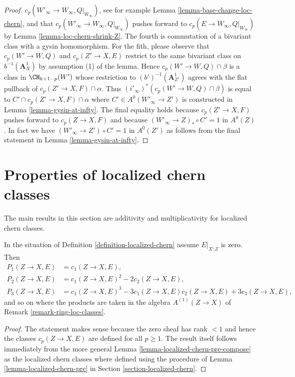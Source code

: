 \begin{proof}
$c_p(W'_\infty \to W_\infty, Q|_{W_\infty})$, see for example
Lemma \ref{lemma-base-change-loc-chern}, and that
$c_p(W'_\infty \to W_\infty, Q|_{W_\infty})$
pushes forward to $c_p(E \to W_\infty, Q|_{W_\infty})$
by Lemma \ref{lemma-loc-chern-shrink-Z}.
The fourth is commutation of a bivariant class with
a gysin homomorphism. For the fith, please observe that
$c_p(W' \to W, Q)$ and $c_p(Z' \to X, E)$ restrict to the
same bivariant class on $b^{-1}(\mathbf{A}^1_X)$ by
assumption (1) of the lemma. Hence $c_p(W' \to W, Q) \cap \beta$
is a class in $\CH_{k + 1 - p}(W')$ whose restriction to
$(b')^{-1}(\mathbf{A}^1_{Z'})$ agrees with the flat pullback
of $c_p(Z' \to X, F) \cap \alpha$. Thus
$(i'_\infty)^*(c_p(W' \to W, Q) \cap \beta)$ is equal to
$C' \cap c_p(Z' \to X, F) \cap \alpha$ where
$C' \in A^0(W'_\infty \to Z')$ is constructed in
Lemma \ref{lemma-gysin-at-infty}.
The final equality holds because $c_p(Z' \to X, F)$ pushes forward
to $c_p(Z \to X, F)$ and because $(W'_\infty \to Z)_* \circ C' = 1$ in $A^0(Z)$.
In fact we have $(W'_\infty \to Z') \circ C' = 1$ in $A^0(Z')$ as
follows from the final statement in Lemma \ref{lemma-gysin-at-infty}.
\end{proof}







\section{Properties of localized chern classes}
\label{section-properties-loc-chern}

\noindent
The main results in this section are additivity and multiplicativity
for localized chern classes.

\begin{lemma}
\label{lemma-loc-chern-character}
In the situation of Definition \ref{definition-localized-chern}
assume $E|_{X \setminus Z}$ is zero. Then
\begin{align*}
P_1(Z \to X, E) & = c_1(Z \to X, E), \\
P_2(Z \to X, E) & = c_1(Z \to X, E)^2 - 2c_2(Z \to X, E), \\
P_3(Z \to X, E) & = c_1(Z \to X, E)^3 - 3c_1(Z \to X, E)c_2(Z \to X, E)
+ 3c_3(Z \to X, E),
\end{align*}
and so on where the products are taken in the algebra $A^{(1)}(Z \to X)$
of Remark \ref{remark-ring-loc-classes}.
\end{lemma}

\begin{proof}
The statement makes sense because the zero sheaf has rank $< 1$ and
hence the classes $c_p(Z \to X, E)$ are defined for all $p \geq 1$.
The result itself follows immediately from the more general
Lemma \ref{lemma-localized-chern-pre-compose} as the localized chern
classes where defined using the procedure of
Lemma \ref{lemma-localized-chern-pre}
in Section \ref{section-localized-chern}.
\end{proof}


